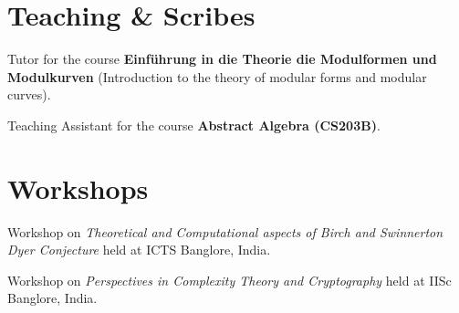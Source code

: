 \documentclass[margin,line]{resume}
\begin{document}
\begin{resume}




\section{\mysidestyle Teaching \& Scribes}
\begin{list2}
        \item Tutor for the course \textbf{Einf\"{u}hrung in die Theorie die Modulformen und Modulkurven} (Introduction to the theory of modular forms and modular curves).
        \item Teaching Assistant for the course \textbf{Abstract Algebra (CS203B)}.
\end{list2}
\section{\mysidestyle Workshops}
\begin{list2}
        \item Workshop on \emph{Theoretical and Computational aspects of Birch and Swinnerton Dyer Conjecture} held at ICTS Banglore, India.\vspace{1.5mm}
\item Workshop on \emph{Perspectives in Complexity Theory and Cryptography} held at IISc Banglore, India.
\end{list2}



\end{resume}
\end{document}
